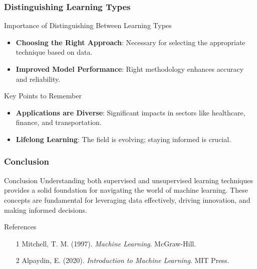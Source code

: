 \documentclass[aspectratio=169]{beamer}
\begin{document}
\begin{frame}[fragile]
    \frametitle{Distinguishing Learning Types}
    \begin{block}{Importance of Distinguishing Between Learning Types}
        \begin{itemize}
            \item \textbf{Choosing the Right Approach}: Necessary for selecting the appropriate technique based on data.
            \item \textbf{Improved Model Performance}: Right methodology enhances accuracy and reliability.
        \end{itemize}
    \end{block}

    \begin{block}{Key Points to Remember}
        \begin{itemize}
            \item \textbf{Applications are Diverse}: Significant impacts in sectors like healthcare, finance, and transportation.
            \item \textbf{Lifelong Learning}: The field is evolving; staying informed is crucial.
        \end{itemize}
    \end{block}
\end{frame}

\begin{frame}[fragile]
    \frametitle{Conclusion}
    \begin{block}{Conclusion}
        Understanding both supervised and unsupervised learning techniques provides a solid foundation for navigating the world of machine learning. These concepts are fundamental for leveraging data effectively, driving innovation, and making informed decisions.
    \end{block}

    \begin{block}{References}
        \begin{itemize}
            \item [1] Mitchell, T. M. (1997). \textit{Machine Learning}. McGraw-Hill.
            \item [2] Alpaydin, E. (2020). \textit{Introduction to Machine Learning}. MIT Press.
        \end{itemize}
    \end{block}
\end{frame}
\end{document}
